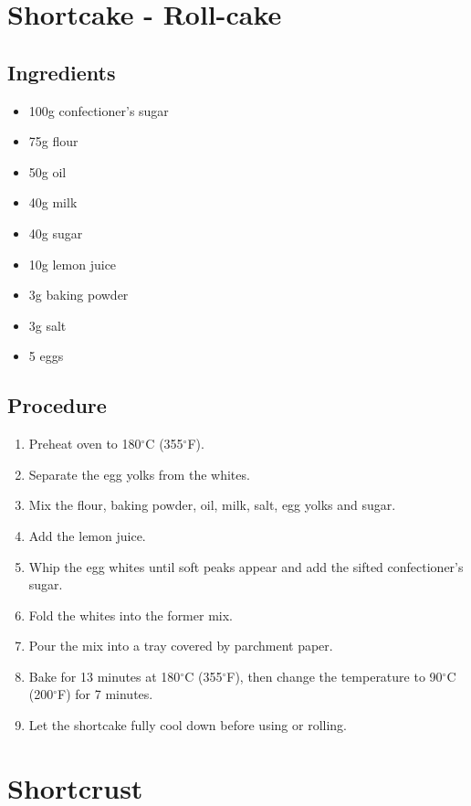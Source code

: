 \documentclass[10pt]{book}
\newcommand{\degree}{$^\circ$}
\begin{document}
\newpage\section*{Shortcake - Roll-cake}
\subsection*{Ingredients}
	\begin{itemize}
		\item 100g confectioner's sugar
		\item 75g flour
		\item 50g oil
		\item 40g milk
		\item 40g sugar
		\item 10g lemon juice
		\item 3g baking powder
		\item 3g salt
		\item 5 eggs		
	\end{itemize}
\subsection*{Procedure}
	\begin{enumerate}
		\item Preheat oven to 180{\degree}C (355{\degree}F).
		\item Separate the egg yolks from the whites.
		\item Mix the flour, baking powder, oil, milk, salt, egg yolks and sugar.
		\item Add the lemon juice.
		\item Whip the egg whites until soft peaks appear and add the sifted confectioner's sugar.
		\item Fold the whites into the former mix.
		\item Pour the mix into a tray covered by parchment paper.
		\item Bake for 13 minutes at 180{\degree}C (355{\degree}F), then change the temperature to 90{\degree}C (200{\degree}F) for 7 minutes.
		\item Let the shortcake fully cool down before using or rolling.
	\end{enumerate}
\newpage

\newpage\section*{Shortcrust}
\end{document}
